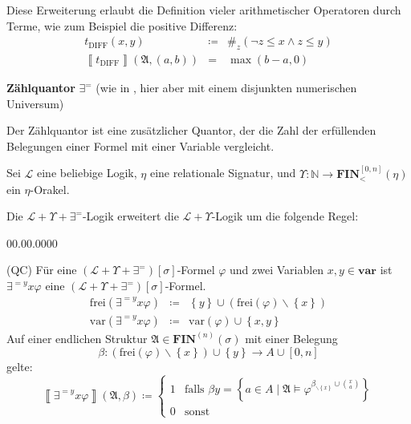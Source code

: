 \begin{example*}
Diese Erweiterung erlaubt die Definition vieler arithmetischer Operatoren
durch Terme, wie zum Beispiel die positive Differenz:
\begin{eqnarray*}
t_{\mathrm{DIFF}}\left(x,y\right) & \coloneqq & \#_{z}\left(\neg z\leqslant x\wedge z\leqslant y\right)\\
\left\llbracket t_{\mathrm{DIFF}}\right\rrbracket \left(\mathfrak{A},\left(a,b\right)\right) & = & \max\left(b-a,0\right)
\end{eqnarray*}
\end{example*}
\begin{defn}
\textbf{Zählquantor }$\exists^{=}$ (wie in \cite{Schweikardt:2005:AFL:1071596.1071602},
hier aber mit einem disjunkten numerischen Universum)

Der Zählquantor ist eine zusätzlicher Quantor, der die Zahl der erfüllenden
Belegungen einer Formel mit einer Variable vergleicht.

Sei $\mathcal{L}$ eine beliebige Logik, $\eta$ eine relationale
Signatur, und $\Upsilon:\mathbb{N}\rightarrow\mathbf{FIN}_{<}^{\left[0,n\right]}\left(\eta\right)$
ein $\eta$-Orakel.

Die $\mathcal{L}+\Upsilon+\exists^{=}$-Logik erweitert die $\mathcal{L}+\Upsilon$-Logik
um die folgende Regel:

\begin{labeling}{00.00.0000}
\item [{(QC)}] Für eine $\left(\mathcal{L}+\Upsilon+\exists^{=}\right)\left[\sigma\right]$-Formel
$\varphi$ und zwei Variablen $x,y\in\mathbf{var}$ ist $\exists^{=y}x\varphi$
eine $\left(\mathcal{L}+\Upsilon+\exists^{=}\right)\left[\sigma\right]$-Formel.
\begin{eqnarray*}
\mathrm{frei}\left(\exists^{=y}x\varphi\right) & \coloneqq & \left\{ y\right\} \cup\left(\mathrm{frei}\left(\varphi\right)\backslash\left\{ x\right\} \right)\\
\mathrm{var}\left(\exists^{=y}x\varphi\right) & \coloneqq & \mathrm{var}\left(\varphi\right)\cup\left\{ x,y\right\} 
\end{eqnarray*}
Auf einer endlichen Struktur $\mathfrak{A}\in\mathbf{FIN}^{\left(n\right)}\left(\sigma\right)$
mit einer Belegung 
\[
\beta:\left(\mathrm{frei}\left(\varphi\right)\backslash\left\{ x\right\} \right)\cup\left\{ y\right\} \rightarrow A\cup\left[0,n\right]
\]
gelte: 
\[
\left\llbracket \exists^{=y}x\varphi\right\rrbracket \left(\mathfrak{A},\beta\right)\coloneqq\begin{cases}
1 & \mathrm{falls}\,\,\beta y=\left\{ a\in A\mid\mathfrak{A}\models\varphi^{\beta_{\backslash\left\{ x\right\} }\cup\binom{x}{a}}\right\} \\
0 & \mathrm{sonst}
\end{cases}
\]
\end{labeling}
\end{defn}

